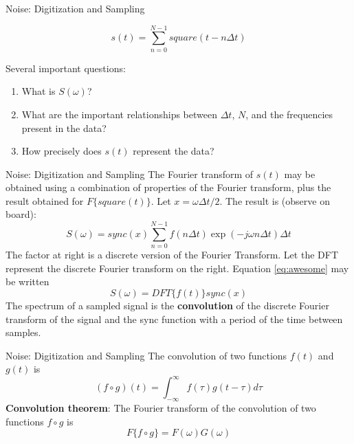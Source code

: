 \documentclass{beamer}
\begin{document}
\begin{frame}[fragile]{Noise: Digitization and Sampling}
\begin{tcolorbox}[colback=white,colframe=red!40!blue,title=Sample/Hold Signal Model]
\alert{
\begin{equation}
s(t) = \sum_{n=0}^{N-1} square(t-n\Delta t)
\end{equation}
}
\end{tcolorbox}
Several important questions:
\begin{enumerate}
\item What is $S(\omega)$?
\item What are the important relationships between $\Delta t$, $N$, and the frequencies present in the data?
\item How precisely does $s(t)$ represent the data?
\end{enumerate}
\end{frame}

\begin{frame}{Noise: Digitization and Sampling}
\small
The Fourier transform of $s(t)$ may be obtained using a combination of properties of the Fourier transform, plus the result obtained for $F\lbrace square(t) \rbrace$.  Let $x = \omega \Delta t/2$.  The result is (observe on board):
\begin{equation}
S(\omega) = sync(x) \sum_{n=0}^{N-1} f(n\Delta t) \exp(-j\omega n\Delta t) \Delta t \label{eq:awesome}
\end{equation}
The factor at right is a discrete version of the Fourier Transform.  Let the DFT represent the discrete Fourier transform on the right.  Equation \ref{eq:awesome} may be written
\begin{equation}
S(\omega) = DFT\lbrace f(t) \rbrace sync(x) 
\end{equation}
\alert{The spectrum of a sampled signal is the \textbf{convolution} of the discrete Fourier transform of the signal and the sync function with a period of the time between samples.}
\end{frame}

\begin{frame}{Noise: Digitization and Sampling}
The convolution of two functions $f(t)$ and $g(t)$ is 
\begin{equation}
(f \circ g) (t) = \int_{-\infty}^{\infty} f(\tau) g(t-\tau) d\tau
\end{equation}
\textbf{Convolution theorem}:  The Fourier transform of the convolution of two functions $f \circ g$ is
\begin{equation}
F\lbrace f \circ g\rbrace = F(\omega) G(\omega)
\end{equation}
\end{frame}
\end{document}
